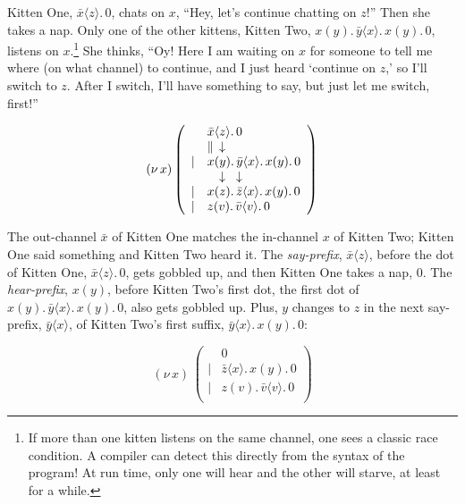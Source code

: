 \documentclass[10pt,oneside,x11names]{article}
\newcommand\napping    [0]{0}
\newcommand\chatting   [3]{\bar{#1}\langle{#2}\rangle{}.\,#3}
\newcommand\listening  [3]{#1(#2).\,#3}
\newcommand\whispering [2]{(\nu\,#1)\,{#2}}
\newcommand{\kitOne}{\chatting{x}{z}{\napping}}
\newcommand{\kitTwo}{\listening{x}{y}{\chatting{y}{x}{\listening{x}{y}{\napping}}}}
\newcommand{\kitThree}{\listening{z}{v}{\chatting{v}{v}{\napping}}}
\newcommand{\kitTwoSuffixx}{\chatting{y}{x}{\listening{x}{y}{\napping}}}
\theoremstyle{definition}
\theoremstyle{warning}
\begin{document}
Kitten One, \(\kitOne\), chats on \(x\), ``Hey, let's continue chatting
on \(z\)!'' Then she takes a nap. Only one of the other kittens,
Kitten Two, \(\kitTwo\), listens on \(x\).\footnote{If more than one
kitten listens on the same channel, one sees a classic race
condition. A compiler can detect this directly from the syntax of
the program! At run time, only one will hear and the other will
starve, at least for a while.} She thinks, ``Oy! Here I am waiting
on \(x\) for someone to tell me where (on what channel) to continue,
and I just heard `continue on \(z\),' so I'll switch to \(z\). After I
switch, I'll have something to say, but just let me switch,
first!''

\begin{equation}
\whispering{x}{\left(
\begin{array}{clll}
 {}     & \kitOne \\
 {}     & \parallel \hspace{4.5pt} \downarrow \\
 \vert  & \kitTwo \\
 {}     & \hspace{9.5pt}\downarrow\hspace{8.5pt}\downarrow \\
 \vert  & \listening{x}{z}{\chatting{z}{x}{\listening{x}{y}{\napping}}} \\
 \vert  & \kitThree \\
\end{array}\right)}
\end{equation}

The out-channel \(\bar{x}\) of Kitten One matches the in-channel \(x\)
of Kitten Two; Kitten One said something and Kitten Two heard it.
The \emph{say-prefix}, \(\bar{x}\langle{}z\rangle\), before the dot of
Kitten One, \(\kitOne\), gets gobbled up, and then Kitten One takes a
nap, \(0\). The \emph{hear-prefix}, \(x(y)\), before Kitten Two's first dot, the
first dot of \(\kitTwo\), also gets gobbled up. Plus, \(y\) changes to
\(z\) in the next say-prefix, \(\bar{y}\langle{x}\rangle\), of Kitten
Two's first suffix, \(\kitTwoSuffixx\):

\begin{equation}
\label{eqn:after-step-one}
\whispering{x}{\left(
\begin{array}{clll}
 {}     & \napping  \\
 \vert  & \chatting{z}{x}{\listening{x}{y}{\napping}} \\
 \vert  & \listening{z}{v}{\chatting{v}{v}{\napping}} \\
\end{array}\right)}
\end{equation}
\end{document}
